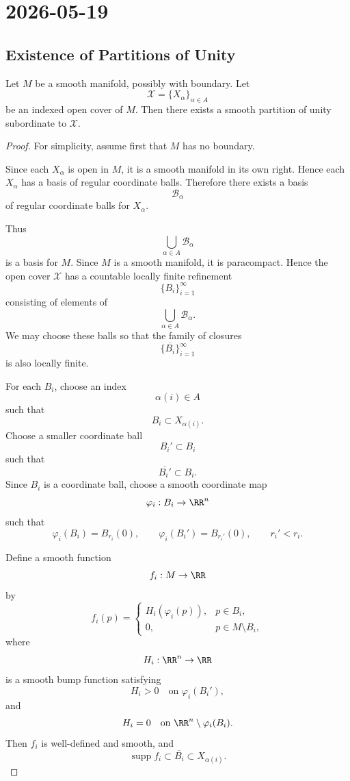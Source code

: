 \section{2026-05-19}

\subsection{Existence of Partitions of Unity}

\begin{theorem}
Let $M$ be a smooth manifold, possibly with boundary. Let
\[
  \mathcal X=\{X_\alpha\}_{\alpha\in A}
\]
be an indexed open cover of $M$. Then there exists a smooth partition of unity
subordinate to $\mathcal X$.
\end{theorem}

\begin{proof}
For simplicity, assume first that $M$ has no boundary.

Since each $X_\alpha$ is open in $M$, it is a smooth manifold in its own right. Hence each $X_\alpha$ has a basis of regular coordinate balls. Therefore there exists a basis
\[
  \mathcal B_\alpha
\]
of regular coordinate balls for $X_\alpha$.

Thus
\[
  \bigcup_{\alpha\in A}\mathcal B_\alpha
\]
is a basis for $M$. Since $M$ is a smooth manifold, it is paracompact. Hence the open cover $\mathcal X$ has a countable locally finite refinement
\[
  \{B_i\}_{i=1}^\infty
\]
consisting of elements of
\[
  \bigcup_{\alpha\in A}\mathcal B_\alpha.
\]
We may choose these balls so that the family of closures
\[
  \{\overline{B_i}\}_{i=1}^\infty
\]
is also locally finite.

For each $B_i$, choose an index
\[
  \alpha(i)\in A
\]
such that
\[
  B_i\subset X_{\alpha(i)}.
\]
Choose a smaller coordinate ball
\[
  B_i'\subset B_i
\]
such that
\[
  \overline{B_i'}\subset B_i.
\]
Since $B_i$ is a coordinate ball, choose a smooth coordinate map
\[
  \varphi_i:B_i\to \RR^n
\]
such that
\[
  \varphi_i(B_i)=B_{r_i}(0),
  \qquad
  \varphi_i(B_i')=B_{r_i'}(0),
  \qquad
  r_i'<r_i.
\]

Define a smooth function
\[
  f_i:M\to \RR
\]
by
\[
  f_i(p)=
  \begin{cases}
    H_i(\varphi_i(p)), & p\in B_i,\\
    0, & p\in M\setminus B_i,
  \end{cases}
\]
where
\[
  H_i:\RR^n\to\RR
\]
is a smooth bump function satisfying
\[
  H_i>0
  \quad\text{on }\varphi_i(B_i'),
\]
and
\[
  H_i=0
  \quad\text{on }\RR^n\setminus \varphi_i(B_i).
\]
Then $f_i$ is well-defined and smooth, and
\[
  \operatorname{supp} f_i\subset \overline{B_i}\subset X_{\alpha(i)}.
\]


\end{proof}
